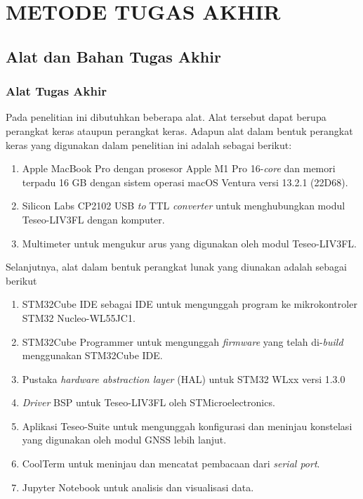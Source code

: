 \chapter{METODE TUGAS AKHIR}

\section{Alat dan Bahan Tugas Akhir}
\subsection{Alat Tugas Akhir}
Pada penelitian ini dibutuhkan beberapa alat. Alat tersebut dapat berupa perangkat keras ataupun perangkat keras. Adapun alat dalam bentuk perangkat keras yang digunakan dalam penelitian ini adalah sebagai berikut:
\begin{enumerate}
	\item Apple MacBook Pro dengan prosesor Apple M1 Pro 16-\textit{core} dan memori terpadu 16 GB dengan sistem operasi macOS Ventura versi 13.2.1 (22D68).
	\item Silicon Labs CP2102 USB \textit{to} TTL \textit{converter} untuk menghubungkan modul Teseo\hyp{}LIV3FL dengan komputer.
	\item Multimeter untuk mengukur arus yang digunakan oleh modul Teseo\hyp{}LIV3FL.
\end{enumerate}
Selanjutnya, alat dalam bentuk perangkat lunak yang diunakan adalah sebagai berikut
\begin{enumerate}
	\item STM32Cube IDE sebagai IDE untuk mengunggah program ke mikrokontroler STM32 Nucleo-WL55JC1.
	\item STM32Cube Programmer untuk mengunggah \textit{firmware} yang telah di-\textit{build} menggunakan STM32Cube IDE.
	\item Pustaka \textit{hardware abstraction layer} (HAL) untuk STM32 WLxx versi 1.3.0
	\item \textit{Driver} BSP untuk Teseo\hyp{}LIV3FL oleh STMicroelectronics.
	\item Aplikasi Teseo-Suite untuk mengunggah konfigurasi dan meninjau konstelasi yang digunakan oleh modul GNSS lebih lanjut.
	\item CoolTerm untuk meninjau dan mencatat pembacaan dari \textit{serial port}.
	\item Jupyter Notebook untuk analisis dan visualisasi data.
\end{enumerate}

